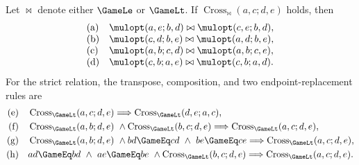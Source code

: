\begin{theorem}
  \label{thm:cross-calculus}
  \leanok
  Let \(\mathrel{\bowtie}\) denote either \(\GameLe\) or \(\GameLt\).  If
  \(\operatorname{Cross}_{\bowtie}(a,c;d,e)\) holds, then
  \[
    \begin{array}{ll}
      \text{(a)}&
        \mulopt(a,e;b,d)\mathrel{\bowtie}\mulopt(c,e;b,d),\\
      \text{(b)}&
        \mulopt(c,d;b,e)\mathrel{\bowtie}\mulopt(a,d;b,e),\\
      \text{(c)}&
        \mulopt(a,b;c,d)\mathrel{\bowtie}\mulopt(a,b;c,e),\\
      \text{(d)}&
        \mulopt(c,b;a,e)\mathrel{\bowtie}\mulopt(c,b;a,d).
    \end{array}
  \]
  For the strict relation, the transpose, composition, and two endpoint-replacement rules are
  \[
    \begin{aligned}
      \text{(e)}\quad&
      \operatorname{Cross}_{\GameLt}(a,c;d,e)
        \Longrightarrow \operatorname{Cross}_{\GameLt}(d,e;a,c),\\
      \text{(f)}\quad&
      \operatorname{Cross}_{\GameLt}(a,b;d,e)\ \wedge
      \operatorname{Cross}_{\GameLt}(b,c;d,e)
        \Longrightarrow \operatorname{Cross}_{\GameLt}(a,c;d,e),\\
      \text{(g)}\quad&
      \operatorname{Cross}_{\GameLt}(a,b;d,e)\ \wedge
      bd\GameEq cd\ \wedge\ be\GameEq ce
        \Longrightarrow \operatorname{Cross}_{\GameLt}(a,c;d,e),\\
      \text{(h)}\quad&
      ad\GameEq bd\ \wedge\ ae\GameEq be\ \wedge
      \operatorname{Cross}_{\GameLt}(b,c;d,e)
        \Longrightarrow \operatorname{Cross}_{\GameLt}(a,c;d,e).
    \end{aligned}
  \]
\end{theorem}
